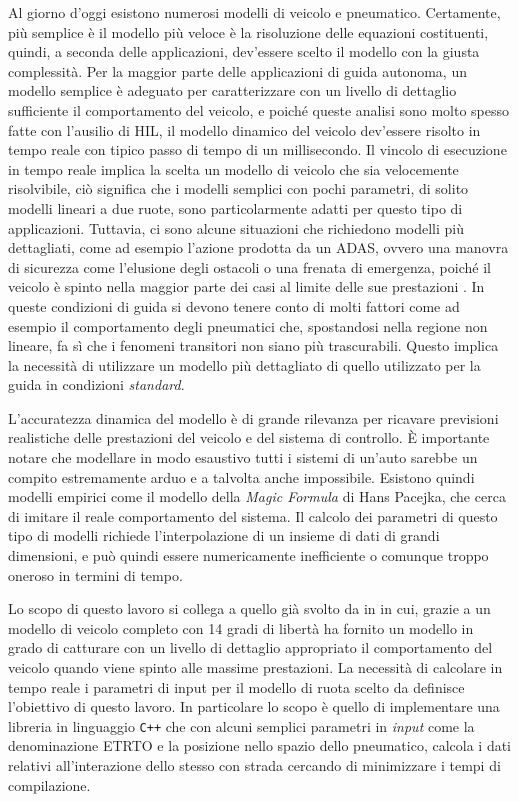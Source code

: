 Al giorno d'oggi esistono numerosi modelli di veicolo e pneumatico. Certamente, più semplice è il modello più veloce è la risoluzione delle equazioni costituenti, quindi, a seconda delle applicazioni, dev'essere scelto il modello con la giusta complessità. Per la maggior parte delle applicazioni di guida autonoma, un modello semplice è adeguato per caratterizzare con un livello di dettaglio sufficiente il comportamento del veicolo, e poiché queste analisi sono molto spesso fatte con l'ausilio di \ac{HIL}, il modello dinamico del veicolo dev'essere risolto in tempo reale con tipico passo di tempo di un millisecondo. Il vincolo di esecuzione in tempo reale implica la scelta un modello di veicolo che sia velocemente risolvibile, ciò significa che i modelli semplici con pochi parametri, di solito modelli lineari a due ruote, sono particolarmente adatti per questo tipo di applicazioni. Tuttavia, ci sono alcune situazioni che richiedono modelli più dettagliati, come ad esempio l'azione prodotta da un \ac{ADAS}, ovvero una manovra di sicurezza come l'elusione degli ostacoli o una frenata di emergenza, poiché il veicolo è spinto nella maggior parte dei casi al limite delle sue prestazioni \cite{impacts}. In queste condizioni di guida si devono tenere conto di molti fattori come ad esempio il comportamento degli pneumatici che, spostandosi nella regione non lineare, fa sì che i fenomeni transitori non siano più trascurabili. Questo implica la necessità di utilizzare un modello più dettagliato di quello utilizzato per la guida in condizioni \textit{standard}.

L'accuratezza dinamica del modello è di grande rilevanza per ricavare previsioni realistiche delle prestazioni del veicolo e del sistema di controllo. È importante notare che modellare in modo esaustivo tutti i sistemi di un'auto sarebbe un compito estremamente arduo e a talvolta anche impossibile. Esistono quindi modelli empirici come il modello della \textit{Magic Formula} di Hans Pacejka, che cerca di imitare il reale comportamento del sistema. Il calcolo dei parametri di questo tipo di modelli richiede l'interpolazione di un insieme di dati di grandi dimensioni, e può quindi essere numericamente inefficiente o comunque troppo oneroso in termini di tempo.

Lo scopo di questo lavoro si collega a quello già svolto da \citeauthor{Larcher} in \cite{Larcher} in cui, grazie a un modello di veicolo completo con 14 gradi di libertà ha fornito un modello in grado di catturare con un livello di dettaglio appropriato il comportamento del veicolo quando viene spinto alle massime prestazioni. La necessità di calcolare in tempo reale i parametri di input per il modello di ruota scelto da \cite{Larcher} definisce l'obiettivo di questo lavoro. In particolare lo scopo è quello di implementare una libreria in linguaggio \texttt{C++} che con alcuni semplici parametri in \textit{input} come la denominazione \ac{ETRTO} e la posizione nello spazio dello pneumatico, calcola i dati relativi all'interazione dello stesso con strada cercando di minimizzare i tempi di compilazione.
